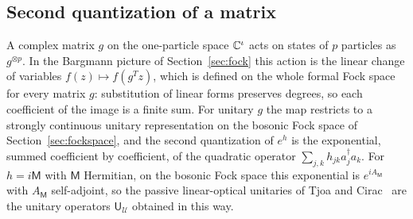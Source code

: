 \providecommand{\cU}{\mathcal U}
\providecommand{\cV}{\mathcal V}
\providecommand{\sU}{\mathsf U}
\providecommand{\dG}{d\Gamma}
\providecommand{\ntot}{n_{\mathrm{tot}}}
\providecommand{\dom}{\operatorname{dom}}
\begin{vetdenv}
\section{Second quantization of a matrix}\label{sec:secondquant}

A complex matrix $g$ on the one-particle space $\mathbb C^\iota$ acts on states of $p$ particles as
$g^{\otimes p}$. In the Bargmann picture of Section~\ref{sec:fock} this action is the linear change of
variables $f(z)\mapsto f(g^Tz)$, which is defined on the whole formal Fock space for every matrix $g$:
substitution of linear forms preserves degrees, so each coefficient of the image is a finite sum. For
unitary $g$ the map restricts to a strongly continuous unitary representation on the bosonic Fock space
of Section~\ref{sec:fockspace}, and the second quantization of $e^h$ is the exponential, summed coefficient by
coefficient, of the quadratic operator $\sum_{j,k}h_{jk}a_j^\dagger a_k$. For $h=i\mathsf M$ with $\mathsf M$ Hermitian,
on the bosonic Fock space this exponential is $e^{iA_{\mathsf M}}$ with $A_{\mathsf M}$ self-adjoint, so the passive
linear-optical unitaries of Tjoa and Cirac~\cite{tjoacirac} are the unitary operators $\sU_\cU$ obtained in this way.


\end{vetdenv}
